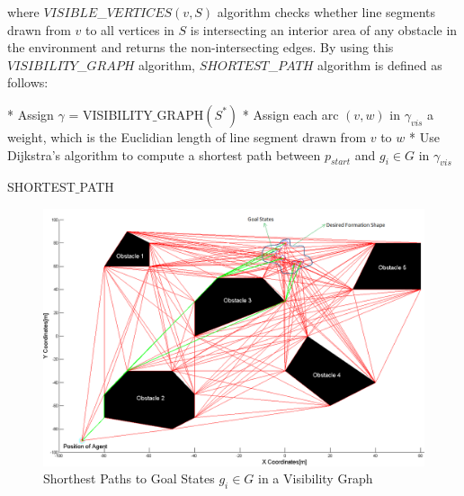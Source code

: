 where $VISIBLE$\_$VERTICES(v,S)$ algorithm checks whether line segments drawn from $v$ to all vertices in $S$ is intersecting an interior area of any obstacle in the environment and returns the non-intersecting edges.  By using this $VISIBILITY$\_$GRAPH$ algorithm, $SHORTEST$\_$PATH$ algorithm is defined as follows:


	
\begin{algorithm}[H]
* Assign $\gamma$ = VISIBILITY$\_$GRAPH$(S^*)$ \newline
* Assign each arc $(v,w)$ in $\gamma_{vis}$ a weight, which is the Euclidian length of line segment drawn from $v$ to $w$ \newline
{}
{
* Use Dijkstra's algorithm to compute a shortest path between $p_{start}$ and $g_i \in G$ in $\gamma_{vis}$
}
\caption{SHORTEST$\_$PATH}
\end{algorithm}
  
\vspace{2cm}

\begin{figure}[H]
\caption{Shorthest Paths to Goal States $g_i \in G$ in a Visibility Graph} \label{dijksttae_visibility}
\centering
\includegraphics[scale = 0.40]{visgraph2}
\end{figure} 

